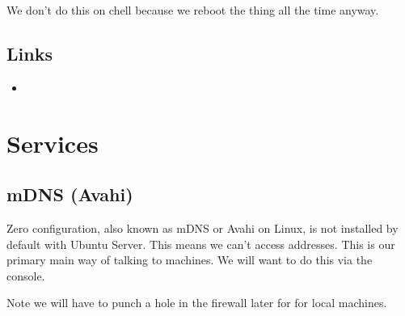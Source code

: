 \documentclass[a4paper,10pt,english]{sphinxmanual}
\begin{document}
\begin{sphinxVerbatim}[commandchars=\\\{\}]
   
   
  
\end{sphinxVerbatim}

We don’t do this on chell because we reboot the thing all the time anyway.


\section{Links}
\label{\detokenize{livepatch:links}}\begin{itemize}
\item {} 

\end{itemize}


\chapter{Services}
\label{\detokenize{services:services}}\label{\detokenize{services::doc}}

\section{mDNS (Avahi)}
\label{\detokenize{services:mdns-avahi}}
Zero configuration, also known as mDNS or Avahi on Linux, is not installed by
default with Ubuntu Server. This means we can’t access  addresses.
This is our primary main way of talking to machines. We will want to do this via
the console.

\begin{sphinxVerbatim}[commandchars=\\\{\}]
   
   
\end{sphinxVerbatim}

Note we will have to punch a hole in the firewall later for  for
local machines.
\end{document}

